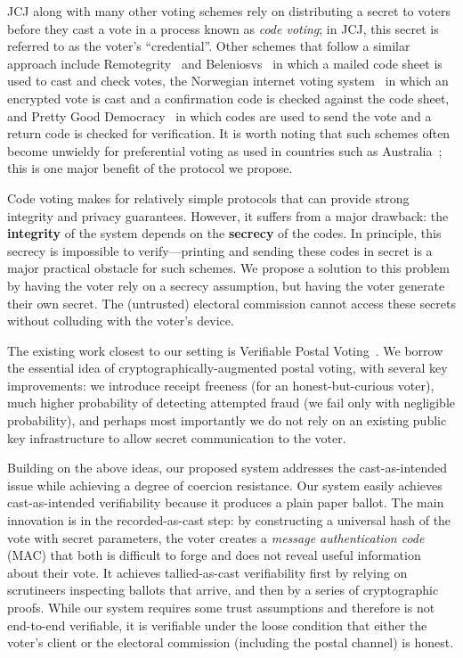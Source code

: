 \documentclass[12pt,a4paper]{article}
\theoremstyle{definition}
\begin{document}
JCJ along with many other voting schemes rely on distributing a secret to voters before they cast a vote in a process known as \textit{code voting}; in JCJ, this secret is referred to as the voter's ``credential''. Other schemes that follow a similar approach include Remotegrity~\cite{zagorski2013remotegrity} and Beleniosvs~\cite{cortier2019beleniosvs} in which a mailed code sheet is used to cast and check votes, the Norwegian internet voting system~\cite{gjosteen2011norwegian} in which an encrypted vote is cast and a confirmation code is checked against the code sheet, and Pretty Good Democracy~\cite{ryan2009pretty} in which codes are used to send the vote and a return code is checked for verification. It is worth noting that such schemes often become unwieldy for preferential voting as used in countries such as Australia~\cite{aditya2003secure}; this is one major benefit of the protocol we propose.

Code voting makes for relatively simple protocols that can provide strong integrity and privacy guarantees. However, it suffers from a major drawback: the \textbf{integrity} of the system depends on the \textbf{secrecy} of the codes. In principle, this secrecy is impossible to verify---printing and sending these codes in secret is a major practical obstacle for such schemes. We propose a solution to this problem by having the voter rely on a secrecy assumption, but having the voter generate their own secret. The (untrusted) electoral commission cannot access these secrets without colluding with the voter's device.

The existing work closest to our setting is Verifiable Postal Voting~\cite{benaloh2013verifiable}. We borrow the essential idea of cryptographically-augmented postal voting, with several key improvements: we introduce receipt freeness (for an honest-but-curious voter), much higher probability of detecting attempted fraud (we fail only with negligible probability), and perhaps most importantly we do not rely on an existing public key infrastructure to allow secret communication to the voter.

Building on the above ideas, our proposed system addresses the cast-as-intended issue while achieving a degree of coercion resistance. Our system easily achieves cast-as-intended verifiability because it produces a plain paper ballot. The main innovation is in the recorded-as-cast step: by constructing a universal hash of the vote with secret parameters, the voter creates a \textit{message authentication code} (MAC) that both is difficult to forge and does not reveal useful information about their vote. It achieves tallied-as-cast verifiability first by relying on scrutineers inspecting ballots that arrive, and then by a series of cryptographic proofs. While our system requires some trust assumptions and therefore is not end-to-end verifiable, it is verifiable under the loose condition that either the voter's client or the electoral commission (including the postal channel) is honest.
\end{document}
